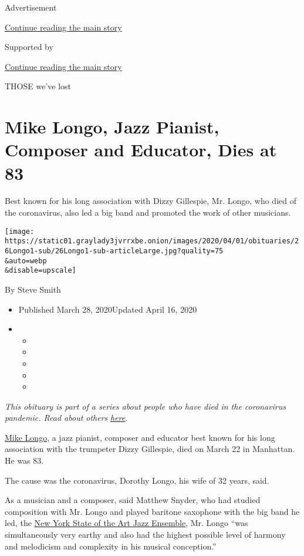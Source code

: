 Advertisement

\protect\hyperlink{after-top}{Continue reading the main story}

Supported by

\protect\hyperlink{after-sponsor}{Continue reading the main story}

THOSE we've lost

\hypertarget{mike-longo-jazz-pianist-composer-and-educator-dies-at-83}{%
\section{Mike Longo, Jazz Pianist, Composer and Educator, Dies at
83}\label{mike-longo-jazz-pianist-composer-and-educator-dies-at-83}}

Best known for his long association with Dizzy Gillespie, Mr. Longo, who
died of the coronavirus, also led a big band and promoted the work of
other musicians.

\texttt{[image: https://static01.graylady3jvrrxbe.onion/images/2020/04/01/obituaries/26Longo1-sub/26Longo1-sub-articleLarge.jpg?quality=75\\\&auto=webp\\\&disable=upscale]}

By Steve Smith

\begin{itemize}
\item
  Published March 28, 2020Updated April 16, 2020
\item
  \begin{itemize}
  \item
  \item
  \item
  \item
  \item
  \end{itemize}
\end{itemize}

\emph{This obituary is part of a series about people who have died in
the coronavirus pandemic. Read about others}
\href{https://www.nytimes3xbfgragh.onion/series/people-who-have-died-of-the-coronavirus}{\emph{here}}\emph{.}

\href{https://www.mikelongojazz.com/}{Mike Longo}, a jazz pianist,
composer and educator best known for his long association with the
trumpeter Dizzy Gillespie, died on March 22 in Manhattan. He was 83.

The cause was the coronavirus, Dorothy Longo, his wife of 32 years,
said.

As a musician and a composer, said Matthew Snyder, who had studied
composition with Mr. Longo and played baritone saxophone with the big
band he led, the \href{https://www.youtube.com/watch?v=Xr-lHtW5wDA}{New
York State of the Art Jazz Ensemble}, Mr. Longo ``was simultaneously
very earthy and also had the highest possible level of harmony and
melodicism and complexity in his musical conception.''

